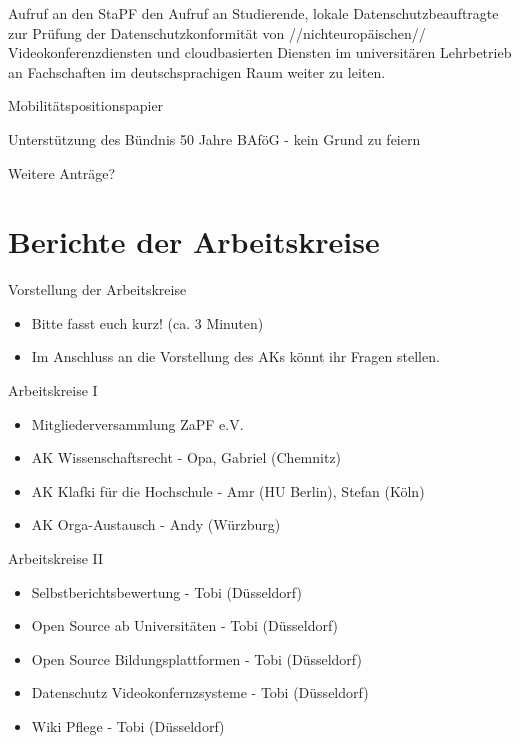 \documentclass[compress, aspectratio=169]{beamer}
\begin{document}
\begin{frame}
\centering
\Large Aufruf an den StaPF den Aufruf an Studierende, lokale Datenschutzbeauftragte zur Prüfung der Datenschutzkonformität von //nichteuropäischen// Videokonferenzdiensten und cloudbasierten Diensten im universitären Lehrbetrieb an Fachschaften im deutschsprachigen Raum weiter zu leiten.
\end{frame}

\begin{frame}
\centering
\huge Mobilitätspositionspapier
\end{frame}


\begin{frame}
\centering
\huge Unterstützung des Bündnis 50 Jahre BAföG - kein Grund zu feiern
\end{frame}


\begin{frame}
\centering
\huge Weitere Anträge?
\end{frame}



\section{Berichte der Arbeitskreise}

\begin{frame}{Vorstellung der Arbeitskreise}
	\begin{itemize}
		\item Bitte fasst euch kurz! (ca. 3 Minuten)
		\item Im Anschluss an die Vorstellung des AKs könnt ihr Fragen stellen.
	\end{itemize}
\end{frame}

\begin{frame}{Arbeitskreise I}
	\begin{itemize}
		\item Mitgliederversammlung ZaPF e.V.
		\item AK Wissenschaftsrecht - Opa, Gabriel (Chemnitz)
		\item AK Klafki für die Hochschule - Amr (HU Berlin), Stefan (Köln)
		\item AK Orga-Austausch - Andy (Würzburg)
	\end{itemize}
\end{frame}

\begin{frame}{Arbeitskreise II}
	\begin{itemize}
		\item Selbstberichtsbewertung - Tobi (Düsseldorf)
		\item Open Source ab Universitäten - Tobi (Düsseldorf)
		\item Open Source Bildungsplattformen - Tobi (Düsseldorf)
		\item Datenschutz Videokonfernzsysteme - Tobi (Düsseldorf)
		\item Wiki Pflege - Tobi (Düsseldorf)
	\end{itemize}
\end{frame}
\end{document}
